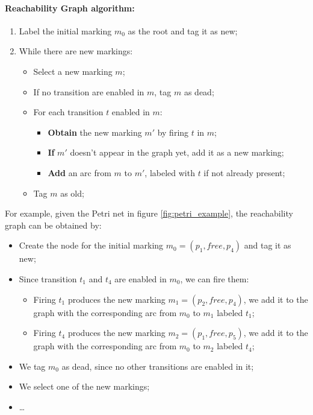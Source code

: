 \paragraph{Reachability Graph algorithm:}
\begin{enumerate}
    \item Label the initial marking \(m_0\) as the root and tag it as new;
    \item While there are new markings:
    \begin{itemize}
        \item Select a new marking \(m\);
        \item If no transition are enabled in \(m\), tag \(m\) as dead;
        \item For each transition \(t\) enabled in \(m\):
        \begin{itemize}
            \item \textbf{Obtain} the new marking \(m'\) by firing \(t\) in \(m\);
            \item \textbf{If} \(m'\) doesn't appear in the graph yet, add it as a new marking;
            \item \textbf{Add} an arc from \(m\) to \(m'\), labeled with \(t\) if not already present;
        \end{itemize}
        \item Tag \(m\) as old;
    \end{itemize}
\end{enumerate}
For example, given the Petri net in figure \ref{fig:petri_example}, the reachability graph can be obtained by:
\begin{itemize}
    \item Create the node for the initial marking \(m_0 = (p_1, free, p_4)\) and tag it as new;
    \item Since transition \(t_1\) and \(t_4\) are enabled in \(m_0\), we can fire them:
    \begin{itemize}
        \item Firing \(t_1\) produces the new marking \(m_1 = (p_2, free, p_4)\), we add it to the graph with the corresponding
        arc from \(m_0\) to \(m_1\) labeled \(t_1\);
        \item Firing \(t_4\) produces the new marking \(m_2 = (p_1, free, p_5)\), we add it to the graph with the corresponding
        arc from \(m_0\) to \(m_2\) labeled \(t_4\);
        
    \end{itemize}
    \item We tag \(m_0\) as dead, since no other transitions are enabled in it;
    \item We select one of the new markings;
    \item \dots
\end{itemize}
